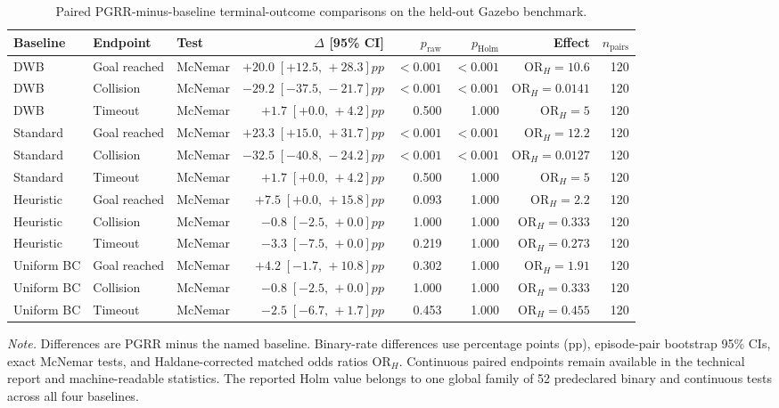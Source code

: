 \begin{table}[t]
\caption{Paired PGRR-minus-baseline terminal-outcome comparisons on the held-out Gazebo benchmark.}
\label{tab:moderate-pairwise-results}
\centering
\scriptsize
\setlength{\tabcolsep}{2.8pt}
\renewcommand{\arraystretch}{1.05}
\begin{tabular}{@{}lllrrrrr@{}}
\toprule
Baseline & Endpoint & Test & $\Delta$ [95\% CI] & $p_{\mathrm{raw}}$
& $p_{\mathrm{Holm}}$ & Effect & $n_{\mathrm{pairs}}$ \\
\midrule
DWB & Goal reached & McNemar & $+20.0\;[+12.5,\,+28.3] pp$ & $<0.001$ & $<0.001$ & $\mathrm{OR}_H=10.6$ & 120 \\
DWB & Collision & McNemar & $-29.2\;[-37.5,\,-21.7] pp$ & $<0.001$ & $<0.001$ & $\mathrm{OR}_H=0.0141$ & 120 \\
DWB & Timeout & McNemar & $+1.7\;[+0.0,\,+4.2] pp$ & 0.500 & 1.000 & $\mathrm{OR}_H=5$ & 120 \\
\addlinespace[2pt]
Standard & Goal reached & McNemar & $+23.3\;[+15.0,\,+31.7] pp$ & $<0.001$ & $<0.001$ & $\mathrm{OR}_H=12.2$ & 120 \\
Standard & Collision & McNemar & $-32.5\;[-40.8,\,-24.2] pp$ & $<0.001$ & $<0.001$ & $\mathrm{OR}_H=0.0127$ & 120 \\
Standard & Timeout & McNemar & $+1.7\;[+0.0,\,+4.2] pp$ & 0.500 & 1.000 & $\mathrm{OR}_H=5$ & 120 \\
\addlinespace[2pt]
Heuristic & Goal reached & McNemar & $+7.5\;[+0.0,\,+15.8] pp$ & 0.093 & 1.000 & $\mathrm{OR}_H=2.2$ & 120 \\
Heuristic & Collision & McNemar & $-0.8\;[-2.5,\,+0.0] pp$ & 1.000 & 1.000 & $\mathrm{OR}_H=0.333$ & 120 \\
Heuristic & Timeout & McNemar & $-3.3\;[-7.5,\,+0.0] pp$ & 0.219 & 1.000 & $\mathrm{OR}_H=0.273$ & 120 \\
\addlinespace[2pt]
Uniform BC & Goal reached & McNemar & $+4.2\;[-1.7,\,+10.8] pp$ & 0.302 & 1.000 & $\mathrm{OR}_H=1.91$ & 120 \\
Uniform BC & Collision & McNemar & $-0.8\;[-2.5,\,+0.0] pp$ & 1.000 & 1.000 & $\mathrm{OR}_H=0.333$ & 120 \\
Uniform BC & Timeout & McNemar & $-2.5\;[-6.7,\,+1.7] pp$ & 0.453 & 1.000 & $\mathrm{OR}_H=0.455$ & 120 \\
\bottomrule
\end{tabular}
\vspace{2pt}

\parbox{0.98\textwidth}{\scriptsize \emph{Note.} Differences are PGRR minus the
named baseline. Binary-rate differences use percentage points (pp), episode-pair bootstrap
95\% CIs, exact McNemar tests, and Haldane-corrected matched odds ratios
$\mathrm{OR}_H$. Continuous paired endpoints remain available in the technical report and
machine-readable statistics. The reported Holm value belongs to one global family of 52 predeclared binary and continuous tests across all four baselines.}
\end{table}
